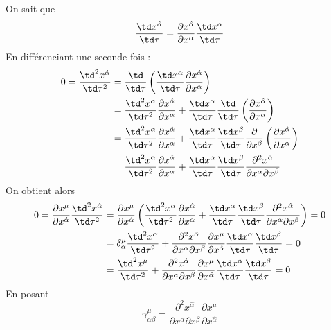 On sait que 
\begin{align}
    \frac{\td x^{\hat{\alpha}}}{\td \tau} = \frac{\partial x^{\hat{\alpha}}}{\partial x^{\alpha}}\frac{\td x^{\alpha}}{\td\tau}
\end{align}
En différenciant une seconde fois :
\begin{align}
    0 = \frac{\td ^2x^{\hat{\alpha}}}{\td \tau^2} &= \frac{\td }{\td \tau}\left(\frac{\td x^{\alpha}}{\td \tau}\frac{\partial x^{\hat{\alpha}}}{\partial x^{\alpha}}\right)\\
    &= \frac{\td ^2x^{\alpha}}{\td \tau^2}\frac{\partial x^{\hat{\alpha}}}{\partial x^{\alpha}} + \frac{\td x^{\alpha}}{\td \tau}\frac{\td }{\td \tau}\left(\frac{\partial x^{\hat{\alpha}}}{\partial x^{\alpha}}\right)\\
    &= \frac{\td ^2x^{\alpha}}{\td \tau^2}\frac{\partial x^{\hat{\alpha}}}{\partial x^{\alpha}} + \frac{\td x^{\alpha}}{\td \tau}\frac{\td x^{\beta}}{\td \tau} \frac{\partial}{\partial x^{\beta}}\left(\frac{\partial x^{\hat{\alpha}}}{\partial x^{\alpha}}\right)\\
    &=\frac{\td ^2x^{\alpha}}{\td \tau^2}\frac{\partial x^{\hat{\alpha}}}{\partial x^{\alpha}} + \frac{\td x^{\alpha}}{\td \tau}\frac{\td x^{\beta}}{\td \tau} \frac{\partial^2 x^{\hat{\alpha}}}{\partial x^{\alpha}\partial x^{\beta}}
\end{align}
On obtient alors
\begin{align}
    0 = \frac{\partial x^{\mu}}{\partial x^{\hat{\alpha}}} \frac{\td ^2x^{\hat{\alpha}}}{\td \tau^2}&= \frac{\partial x^{\mu}}{\partial x^{\hat{\alpha}}} \left(\frac{\td ^2x^{\alpha}}{\td \tau^2}\frac{\partial x^{\hat{\alpha}}}{\partial x^{\alpha}} + \frac{\td x^{\alpha}}{\td \tau}\frac{\td x^{\beta}}{\td \tau} \frac{\partial^2 x^{\hat{\alpha}}}{\partial x^{\alpha}\partial x^{\beta}}\right)=0\\
    &=  \delta^{\mu}_{\alpha}\frac{\td ^2x^{\alpha}}{\td \tau^2} + \frac{\partial^2 x^{\hat{\alpha}}}{\partial x^{\alpha}\partial x^{\beta}}\frac{\partial x^{\mu}}{\partial x^{\hat{\alpha}}} \frac{\td x^{\alpha}}{\td \tau}\frac{\td x^{\beta}}{\td \tau}=0\\
    &= \frac{\td ^2x^{\mu}}{\td \tau^2} + \frac{\partial^2 x^{\hat{\alpha}}}{\partial x^{\alpha}\partial x^{\beta}}\frac{\partial x^{\mu}}{\partial x^{\hat{\alpha}}} \frac{\td x^{\alpha}}{\td \tau}\frac{\td x^{\beta}}{\td \tau}=0
\end{align}
En posant
\begin{equation}
    \gamma^\mu_{\alpha\beta} = \frac{\partial^2 x^{\hat{\alpha}}}{\partial x^{\alpha}\partial x^{\beta}}\frac{\partial x^{\mu}}{\partial x^{\hat{\alpha}}}
\end{equation}

